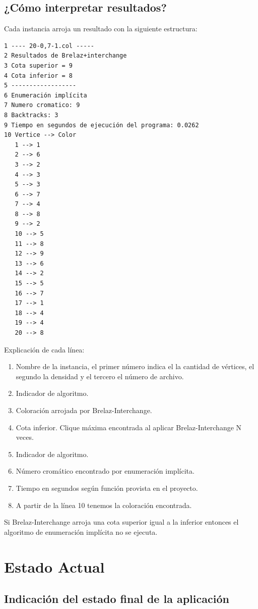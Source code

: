 \documentclass[a4paper,10pt]{article}
\begin{document}
\subsection{¿Cómo interpretar resultados?}
Cada instancia arroja un resultado con la siguiente estructura:
\begin{verbatim}
1 ---- 20-0,7-1.col -----
2 Resultados de Brelaz+interchange 
3 Cota superior = 9                
4 Cota inferior = 8                
5 ------------------               
6 Enumeración implícita            
7 Numero cromatico: 9              
8 Backtracks: 3                    
9 Tiempo en segundos de ejecución del programa: 0.0262
10 Vertice --> Color                
   1 --> 1                          
   2 --> 6                          
   3 --> 2                          
   4 --> 3                          
   5 --> 3                          
   6 --> 7                          
   7 --> 4
   8 --> 8
   9 --> 2
   10 --> 5
   11 --> 8
   12 --> 9
   13 --> 6
   14 --> 2
   15 --> 5
   16 --> 7
   17 --> 1
   18 --> 4
   19 --> 4
   20 --> 8
\end{verbatim}
Explicación de cada línea:
\begin{enumerate}
 \item Nombre de la instancia, el primer número indica el la cantidad de vértices, el segundo la densidad y el tercero el número de archivo.
 \item Indicador de algoritmo.
 \item Coloración arrojada por Brelaz-Interchange.
 \item Cota inferior. Clique máxima encontrada al aplicar Brelaz-Interchange N veces.
 \item Indicador de algoritmo.
 \item Número cromático encontrado por enumeración implícita.
 \item Tiempo en segundos según función provista en el proyecto.
 \item A partir de la l\'inea 10 tenemos la coloraci\'on encontrada.
\end{enumerate}
Si Brelaz-Interchange arroja una cota superior igual a la inferior
entonces el algoritmo de enumeración implícita no se ejecuta.

\section{Estado Actual}
\subsection{Indicación del estado final de la aplicación}
\end{document}
